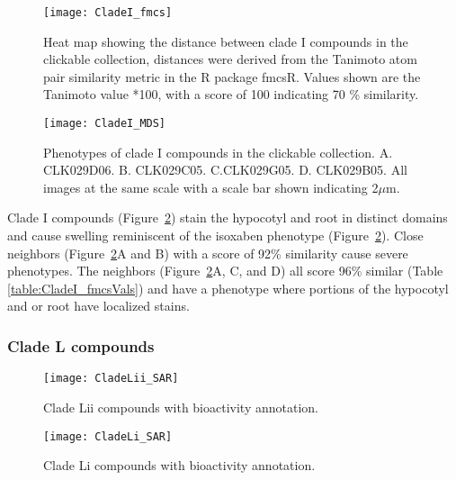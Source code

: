 \begin{figure}\centering
\texttt{[image: CladeI\_fmcs]}
\caption{Heat map showing the distance between clade I compounds in the clickable collection, distances were derived from the Tanimoto atom pair similarity metric in the R package fmcsR. Values shown are the Tanimoto value *100, with a score of 100 indicating 70 {\%} similarity.}
\label{fig:CladeI_fmcs}
\end{figure}


\begin{figure}\centering
\texttt{[image: CladeI\_MDS]}
\caption{Phenotypes of clade I compounds in the clickable collection. A. CLK029D06. B. CLK029C05. C.CLK029G05. D. CLK029B05. All images at the same scale with a scale bar shown indicating 2$\mu$m.}
\label{fig:CladeI_MDS}
\end{figure}

Clade I compounds (Figure~\ref{fig:CladeI_MDS}) stain the hypocotyl and root in distinct domains and cause swelling reminiscent of the isoxaben phenotype (Figure~\ref{fig:CladeI_MDS}). Close neighbors (Figure~\ref{fig:CladeI_MDS}A and B) with a score of 92{\%} similarity cause severe phenotypes. The neighbors  (Figure~\ref{fig:CladeI_MDS}A, C, and D) all score 96{\%} similar (Table \ref{table:CladeI_fmcsVals}) and have a phenotype where portions of the hypocotyl and or root have localized stains.

\clearpage

\subsubsection{Clade L compounds}

\begin{figure}
\texttt{[image: CladeLii\_SAR]}
\caption{Clade Lii compounds with bioactivity annotation.}
\label{fig:CladeLii_SAR}
\end{figure}

\begin{figure}
\texttt{[image: CladeLi\_SAR]}
\caption{Clade Li compounds with bioactivity annotation.}
\label{fig:CladeLi_SAR}
\end{figure}

